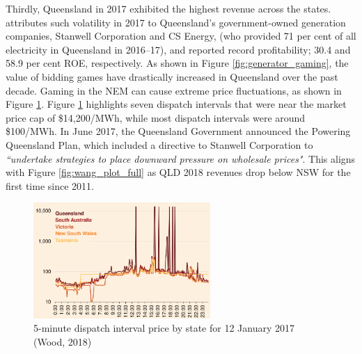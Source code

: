 Thirdly, Queensland in 2017 exhibited the highest revenue across the states. \parencite{grattan} attributes such volatility in 2017 to Queensland’s government-owned generation companies, Stanwell Corporation and CS Energy, (who provided 71 per cent of all electricity in Queensland in 2016–17), and reported record profitability; 30.4 and 58.9 per cent ROE, respectively. As shown in Figure \ref{fig:generator_gaming}, the value of bidding games have drastically increased in Queensland over the past decade. Gaming in the NEM can cause extreme price fluctuations, as shown in Figure \ref{fig:generator_gaming_1}. Figure \ref{fig:generator_gaming_1} highlights seven dispatch intervals that were near the market price cap of \$14,200/MWh, while most dispatch intervals were around \$100/MWh. In June 2017, the Queensland Government announced
the Powering Queensland Plan, which included a directive to Stanwell Corporation to \textit{“undertake strategies to place downward pressure on
wholesale prices"}. This aligns with Figure \ref{fig:wang_plot_full} as QLD 2018 revenues drop below NSW for the first time since 2011.
\begin{figure}
    \centering
    \includegraphics[width=0.6\textwidth]{Pictures/Chapter3/generator_gaming_2.png}
    \caption{5-minute dispatch interval
price by state for 12 January 2017 (Wood, 2018)}
    \label{fig:generator_gaming_1}
\end{figure}